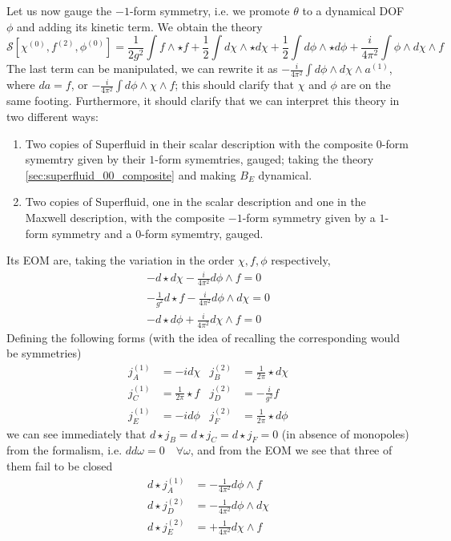 \documentclass[aps,preprint,nofootinbib,preprintnumbers,eqsecnum,superscriptaddress]{revtex4}
\numberwithin{equation}{section}
\begin{document}
Let us now gauge the $-1$-form symmetry, i.e. we promote $\theta$ to a dynamical DOF $\phi$ and adding its kinetic term. We obtain the theory
\begin{equation}
\mathcal{S}[\chi^{(0)}, f^{(2)}, \phi^{(0)}] = \frac{1}{2 g^2} \int f \wedge \star f + \frac{1}{2} \int d\chi \wedge \star d\chi + \frac{1}{2} \int d\phi \wedge \star d\phi + \frac{i }{4 \pi^2} \int \phi \wedge d\chi \wedge f
\end{equation}
The last term can be manipulated, we can rewrite it as $- \frac{i }{4 \pi^2} \int d\phi \wedge d\chi \wedge a^{(1)}$, where $da=f$, or $- \frac{i }{4 \pi^2} \int d\phi \wedge \chi \wedge f$; this should clarify that $\chi$ and $\phi$ are on the same footing. Furthermore, it should clarify that we can interpret this theory in two different ways:
\begin{enumerate}[\itshape i)]
    \item Two copies of Superfluid in their scalar description with the composite $0$-form symemtry given by their $1$-form symemtries, gauged; taking the theory \ref{sec:superfluid_00_composite} and making $B_E$ dynamical.
    \item Two copies of Superfluid, one in the scalar description and one in the Maxwell description, with the composite $-1$-form symmetry given by a $1$-form symmetry and a $0$-form symemtry, gauged.
\end{enumerate}

Its EOM are, taking the variation in the order $\chi, f, \phi$ respectively,
\begin{align}
    -d\star d \chi - \frac{i}{4 \pi^2} d\phi \wedge f = 0 \\
    - \frac{1}{g^2} d\star f - \frac{i}{4 \pi^2} d\phi \wedge d\chi = 0 \\
    -d\star d \phi +  \frac{i}{4 \pi^2} d\chi \wedge f = 0
\end{align}
Defining the following forms (with the idea of recalling the corresponding would be symmetries) 
\begin{align}
    j^{(1)}_A &= -id\chi  & j^{(2)}_B &= \frac{1}{2\pi}\star d\chi \\
     j^{(1)}_C &= \frac{1}{2\pi} \star f  & j^{(2)}_D &= -\frac{i}{g^2} f \\
     j^{(1)}_E &= -id\phi  & j^{(2)}_F &= \frac{1}{2\pi}\star d\phi
\end{align}
we can see immediately that $d\star j_B = d\star j_C = d\star j_F = 0$ (in absence of monopoles) from the formalism, i.e. $dd\omega = 0 \quad \forall\omega$, and from the EOM we see that three of them fail to be closed
\begin{align}
    d \star j^{(1)}_A &= -\frac{1}{4 \pi^2} d\phi \wedge f \\
    d \star j^{(2)}_D &= -\frac{1}{4 \pi^2} d\phi \wedge d \chi \\
    d\star j^{(2)}_E &= +\frac{1}{4 \pi^2} d\chi \wedge f
\end{align}
\end{document}
